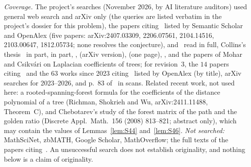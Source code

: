 \documentclass[11pt]{amsart}
\theoremstyle{definition}
\theoremstyle{remark}
\begin{document}
\emph{Coverage.} The project's searches (November 2026, by AI literature
auditors) used general web search and arXiv only (the queries are listed verbatim in
the project's dossier for this problem), the papers citing~\cite{AAB} listed by Semantic Scholar and
OpenAlex (five papers: arXiv:2407.03309, 2206.07561, 2104.14516, 2103.00647,
1812.05734; none resolves the conjecture), \cite{AAB} and~\cite{Col89} read in full, Collins's
thesis~\cite{Col86} in part, \cite{GL78} in part, \cite{Mer90}, \cite{AMW}
(arXiv version), \cite{Pit97} (one page), \cite{CS06}, and the papers of
Mohar and Csikv\'ari on Laplacian coefficients of trees; for revision~3, the
$14$ papers citing~\cite{AMW} and the $63$ works since 2023 citing~\cite{GL78}
listed by OpenAlex (by title), arXiv searches for 2023--2026, \cite{GP71} and
p.~83 of~\cite{GL78} in scans. Related recent work, not used here: a
rooted-spanning-forest formula for the coefficients of the distance
polynomial of a tree (Richman, Shokrieh and Wu, arXiv:2411.11488,
Theorem~C), and Chebotarev's study of the forest matrix of the path and the
golden ratio (Discrete Appl.\ Math.\ 156 (2008) 813--821; abstract only),
which may contain the values of Lemmas~\ref{lem:S44} and~\ref{lem:S46}.
\emph{Not searched:} MathSciNet, zbMATH, Google Scholar, MathOverflow; the
full texts of the papers citing~\cite{AMW}.
An unsuccessful search does not establish originality, and nothing below is
a claim of originality.
\end{document}
